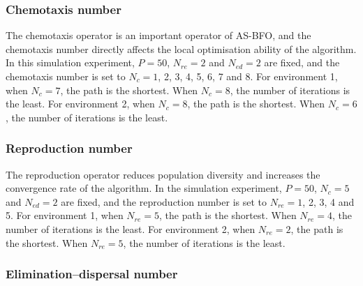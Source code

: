 \documentclass{PDS}%
\theoremstyle{definition}
\begin{document}
\subsubsection{Chemotaxis number}

The chemotaxis operator is an important operator of AS-BFO, and the chemotaxis number
directly affects the local optimisation ability of the algorithm. In this simulation
experiment, $P=50$, $N_{re}=2$ and $N_{ed} =2$ are fixed, and the chemotaxis number is set to $N_c
=1$, 2, 3, 4, 5, 6, 7 and 8. For environment
1, when $N_c =7$, the path is the shortest. When $N_c =8$, the number of iterations is
the least. For environment 2, when $N_c =8$, the path is the shortest. When $N_c =6$, the
number of iterations is the least.


\subsubsection{Reproduction number}

The reproduction operator reduces population diversity and increases the convergence rate of
the algorithm. In the simulation experiment, $P=50$, $N_c =5$ and $N_{ed}=2$ are fixed, and the
reproduction number is set to $N_{re}=1$, 2, 3, 4 and 5. For environment 1, when $N_{re}=5$, the path is the shortest. When
$N_{re}=4$, the number of iterations is the least. For environment 2, when $N_{re}=2$, the
path is the shortest. When $N_{re}=5$, the number of iterations is the least.

\subsubsection{Elimination--dispersal number}
\end{document}
